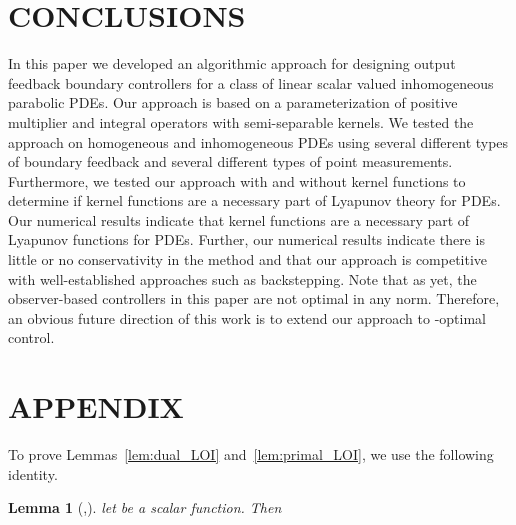 \documentclass[US letter, 9 pt, conference]{ieeeconf}  \usepackage{setspace}
\newtheorem{lemma}{Lemma}
\begin{document}
\section{CONCLUSIONS}
In this paper we developed an algorithmic approach for designing output feedback boundary controllers for a class of linear scalar valued inhomogeneous parabolic PDEs. Our approach is based on a parameterization of positive multiplier and integral operators with semi-separable kernels. We tested the approach on homogeneous and inhomogeneous PDEs using several different types of boundary feedback and several different types of point measurements. Furthermore, we tested our approach with and without kernel functions to determine if kernel functions are a necessary part of Lyapunov theory for PDEs. Our numerical results indicate that kernel functions are a necessary part of Lyapunov functions for PDEs. Further, our numerical results indicate there is little or no conservativity in the method and that our approach is competitive with well-established approaches such as backstepping.
Note that as yet, the observer-based controllers in this paper are not optimal in any norm. Therefore, an obvious future direction of this work is to extend our approach to -optimal control.
\section*{APPENDIX}

To prove Lemmas~\ref{lem:dual_LOI} and~\ref{lem:primal_LOI}, we use the following identity.
\begin{lemma}[\cite{hardy1952inequalities},\cite{krstic2008boundary}]
\label{lem:wirtinger}
 let  be a scalar function. Then
  
\end{lemma}
\end{document}
